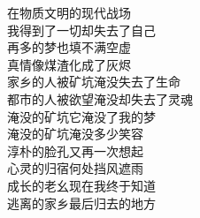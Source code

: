 \begin{songs}{}
	\vspace{2ex}	
	在物质文明的现代战场	\\
	我得到了一切却失去了自己	\\
	再多的梦也填不满空虚	\\
	真情像煤渣化成了灰烬	\\
	家乡的人被矿坑淹没失去了生命	\\
	都市的人被欲望淹没却失去了灵魂	\\
	淹没的矿坑它淹没了我的梦	\\
	淹没的矿坑淹没多少笑容	\\
	淳朴的脸孔又再一次想起	\\
	心灵的归宿何处挡风遮雨	\\
	成长的老幺现在我终于知道	\\
	逃离的家乡最后归去的地方	\\
  \endsong
\end{songs}
